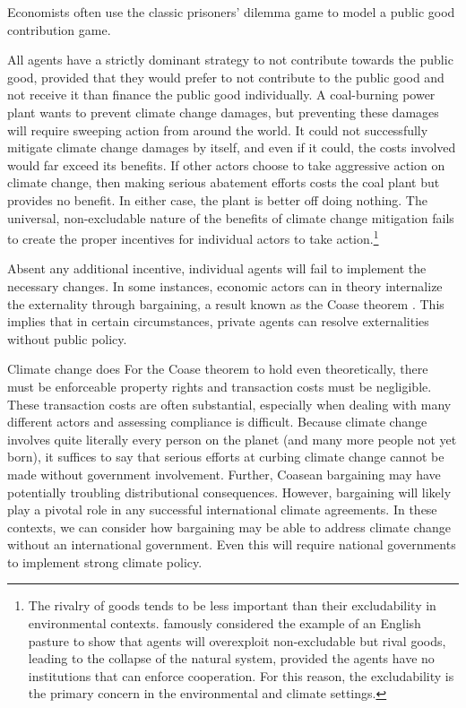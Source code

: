 Economists often use the classic prisoners' dilemma game to model a public good contribution game. 

All agents have a strictly dominant strategy to not contribute towards the public good, provided that they would prefer to not contribute to the public good and not receive it than finance the public good individually. A coal-burning power plant wants to prevent climate change damages, but preventing these damages will require sweeping action from around the world. It could not successfully mitigate climate change damages by itself, and even if it could, the costs involved would far exceed its benefits. If other actors choose to take aggressive action on climate change, then making serious abatement efforts costs the coal plant but provides no benefit. In either case, the plant is better off doing nothing. The universal, non-excludable nature of the benefits of climate change mitigation fails to create the proper incentives for individual actors to take action.\footnote{The rivalry of goods tends to be less important than their excludability in environmental contexts. \cite{hardin1968tragedy} famously considered the example of an English pasture to show that agents will overexploit non-excludable but rival goods, leading to the collapse of the natural system, provided the agents have no institutions that can enforce cooperation. For this reason, the excludability is the primary concern in the environmental and climate settings.}

Absent any additional incentive, individual agents will fail to implement the necessary changes. In some instances, economic actors can in theory internalize the externality through bargaining, a result known as the Coase theorem \citep{coase1960problem}. This implies that in certain circumstances, private agents can resolve externalities without public policy. 

Climate change does 
For the Coase theorem to hold even theoretically, there must be enforceable property rights and transaction costs must be negligible. These transaction costs are often substantial, especially when dealing with many different actors and assessing compliance is difficult. Because climate change involves quite literally every person on the planet (and many more people not yet born), it suffices to say that serious efforts at curbing climate change cannot be made without government involvement. Further, Coasean bargaining may have potentially troubling distributional consequences. However, bargaining will likely play a pivotal role in any successful international climate agreements. In these contexts, we can consider how bargaining may be able to address climate change without an international government. Even this will require national governments to implement strong climate policy.

